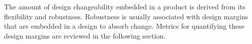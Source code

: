 The amount of design changeability embedded in a product is derived from its flexibility and robustness. Robustness is usually associated with design margins that are embedded in a design to absorb change. Metrics for quantifying these design margins are reviewed in the following section.





\newcommand{\changeCW}{0.55cm}
\newcommand{\mycontCW}{1.2cm}


